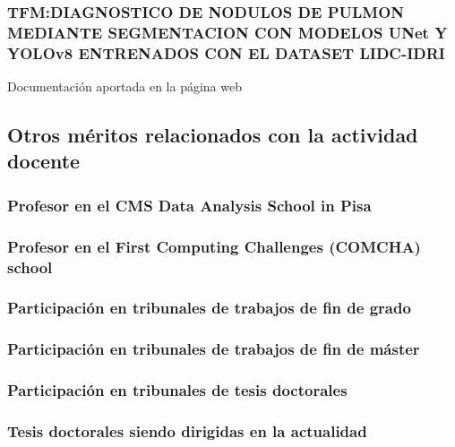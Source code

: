 \documentclass[a4paper, 11pt, twoside, openright]{report}
\begin{document}
\subsubsection{TFM:DIAGNOSTICO DE NODULOS DE PULMON MEDIANTE SEGMENTACION CON MODELOS UNet Y YOLOv8 ENTRENADOS CON EL DATASET LIDC-IDRI}
Documentación aportada en la página web


\subsection{Otros méritos relacionados con la actividad docente}

\subsubsection{Profesor en el CMS Data Analysis School in Pisa}


\subsubsection{Profesor en el First Computing Challenges (COMCHA) school}


\subsubsection{Participación en tribunales de trabajos de fin de grado}


\subsubsection{Participación en tribunales de trabajos de fin de máster}


\subsubsection{Participación en tribunales de tesis doctorales}



\subsubsection{Tesis doctorales siendo dirigidas en la actualidad}

\end{document}

